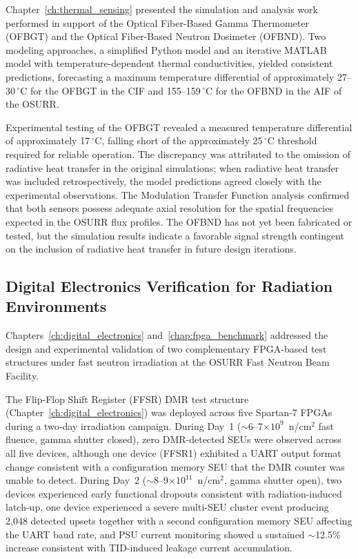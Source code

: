 Chapter~\ref{ch:thermal_sensing} presented the simulation and analysis
work performed in support of the Optical Fiber-Based Gamma Thermometer
(OFBGT) and the Optical Fiber-Based Neutron Dosimeter (OFBND).  Two
modeling approaches, a simplified Python model and an iterative MATLAB
model with temperature-dependent thermal conductivities, yielded
consistent predictions, forecasting a maximum temperature differential
of approximately 27--30$\,^{\circ}$C for the OFBGT in the CIF and
155--159$\,^{\circ}$C for the OFBND in the AIF of the OSURR.

Experimental testing of the OFBGT revealed a measured temperature
differential of approximately 17$\,^{\circ}$C, falling short of the
approximately 25$\,^{\circ}$C threshold required for reliable
operation.  The discrepancy was attributed to the omission of radiative
heat transfer in the original simulations; when radiative heat transfer
was included retrospectively, the model predictions agreed closely with
the experimental observations.  The Modulation Transfer Function
analysis confirmed that both sensors possess adequate axial resolution
for the spatial frequencies expected in the OSURR flux profiles.  The
OFBND has not yet been fabricated or tested, but the simulation results
indicate a favorable signal strength contingent on the inclusion of
radiative heat transfer in future design iterations.


\subsection{Digital Electronics Verification for Radiation
Environments}

Chapters~\ref{ch:digital_electronics} and~\ref{chap:fpga_benchmark}
addressed the design and experimental validation of two complementary
FPGA-based test structures under fast neutron irradiation at the OSURR
Fast Neutron Beam Facility.

The Flip-Flop Shift Register (FFSR) DMR test structure
(Chapter~\ref{ch:digital_electronics}) was deployed across five
Spartan-7 FPGAs during a two-day irradiation campaign.  During
Day~1 ($\sim$6--7$\times 10^9$~n/cm$^2$ fast fluence, gamma
shutter closed), zero DMR-detected SEUs were observed across all
five devices, although one device (FFSR1) exhibited a UART output
format change consistent with a configuration memory SEU that the
DMR counter was unable to detect.  During Day~2
($\sim$8--9$\times 10^{11}$~n/cm$^2$, gamma shutter open), two
devices experienced early functional dropouts consistent with
radiation-induced latch-up, one device experienced a severe multi-SEU
cluster event producing 2,048 detected upsets together with a second
configuration memory SEU affecting the UART baud rate, and PSU
current monitoring showed a sustained $\sim$12.5\% increase
consistent with TID-induced leakage current accumulation.

